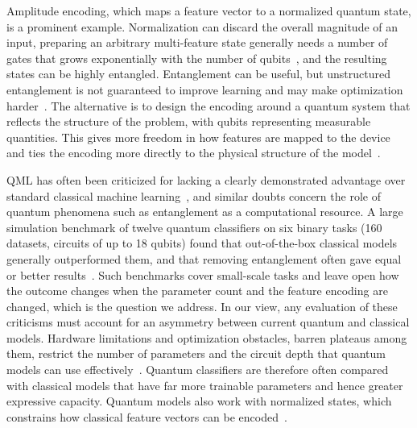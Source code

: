 \documentclass[11pt]{article}
\begin{document}
Amplitude encoding, which maps a feature vector to a normalized quantum state, is a prominent example. Normalization can discard the overall magnitude of an input, preparing an arbitrary multi-feature state generally needs a number of gates that grows exponentially with the number of qubits~\cite{plesch2011state}, and the resulting states can be highly entangled. Entanglement can be useful, but unstructured entanglement is not guaranteed to improve learning and may make optimization harder~\cite{ortizmarrero2021entanglementbp,holmes2022connecting}. The alternative is to design the encoding around a quantum system that reflects the structure of the problem, with qubits representing measurable quantities. This gives more freedom in how features are mapped to the device and ties the encoding more directly to the physical structure of the model~\cite{havlicek2019supervised,schuld2019qmlhilbert}.

QML has often been criticized for lacking a clearly demonstrated advantage over standard classical machine learning~\cite{huang2021powerofdata}, and similar doubts concern the role of quantum phenomena such as entanglement as a computational resource. A large simulation benchmark of twelve quantum classifiers on six binary tasks (160 datasets, circuits of up to 18 qubits) found that out-of-the-box classical models generally outperformed them, and that removing entanglement often gave equal or better results~\cite{bowles2024better}. Such benchmarks cover small-scale tasks and leave open how the outcome changes when the parameter count and the feature encoding are changed, which is the question we address. In our view, any evaluation of these criticisms must account for an asymmetry between current quantum and classical models. Hardware limitations and optimization obstacles, barren plateaus among them, restrict the number of parameters and the circuit depth that quantum models can use effectively~\cite{mcclean2018barren,wang2020noise}. Quantum classifiers are therefore often compared with classical models that have far more trainable parameters and hence greater expressive capacity. Quantum models also work with normalized states, which constrains how classical feature vectors can be encoded~\cite{schuld2021effect}.
\end{document}
